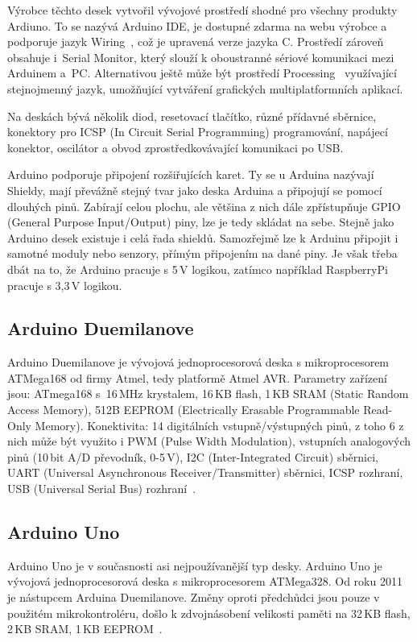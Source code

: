 Výrobce těchto desek vytvořil vývojové prostředí shodné pro všechny produkty Ardiuno. To se nazývá Arduino IDE, je dostupné zdarma na webu výrobce a podporuje jazyk Wiring~\cite{embed_about_wiring_2011}, což je upravená verze jazyka C. Prostředí zároveň obsahuje i~Serial Monitor, který slouží k oboustranné sériové komunikaci mezi Arduinem a~PC. Alternativou ještě může být prostředí Processing~\cite{embed_about_processing_2015} využívající stejnojmenný jazyk, umožňující vytváření grafických multiplatformních aplikací.
	
Na deskách bývá několik diod, resetovací tlačítko, různé přídavné sběrnice, konektory pro ICSP (In Circuit Serial Programming) programování, napájecí konektor, oscilátor a obvod zprostředkovávající komunikaci po USB.
	
Arduino podporuje připojení rozšiřujících karet. Ty se u Arduina nazývají Shieldy, mají převážně stejný tvar jako deska Arduina a připojují se pomocí dlouhých pinů. Zabírají celou plochu, ale většina z nich dále zpřístupňuje GPIO (General Purpose Input/Output) piny, lze je tedy skládat na sebe. Stejně jako Arduino desek existuje i celá řada shieldů. Samozřejmě lze k Arduinu připojit i samotné moduly nebo senzory, přímým připojením na dané piny. Je však třeba dbát na to, že Arduino pracuje s 5\,V logikou, zatímco například RaspberryPi pracuje s 3,3\,V logikou.
	
		\subsection{Arduino Duemilanove} Arduino Duemilanove je vývojová jednoprocesorová deska s mikroprocesorem ATMega168 od firmy Atmel, tedy platformě Atmel AVR. 
		Parametry zařízení jsou: ATmega168 s~16\,MHz krystalem, 16\,KB flash, 1\,KB SRAM (Static Random Access Memory), 512B EEPROM (Electrically Erasable Programmable Read-Only Memory). 	Konektivita: 14 digitálních vstupně/výstupných pinů, z toho 6 z nich může být využito i PWM (Pulse Width Modulation), vstupních analogových pinů (10\,bit A/D převodník, 0-5\,V), I2C (Inter-Integrated Circuit) sběrnici, UART (Universal Asynchronous Receiver/Transmitter) sběrnici, ICSP rozhraní, USB (Universal Serial Bus) rozhraní~\cite{ArduinoDuemilanove}.	
	
		\subsection{Arduino Uno} Arduino Uno je v současnosti asi nejpoužívanější typ desky. Arduino Uno je vývojová jednoprocesorová deska s mikroprocesorem ATMega328. Od roku 2011 je nástupcem Arduina Duemilanove. Změny oproti předchůdci jsou pouze v použitém mikrokontroléru, došlo k zdvojnásobení velikosti paměti na 32\,KB flash, 2\,KB SRAM, 1\,KB EEPROM~\cite{ArduinoUno}.
	
